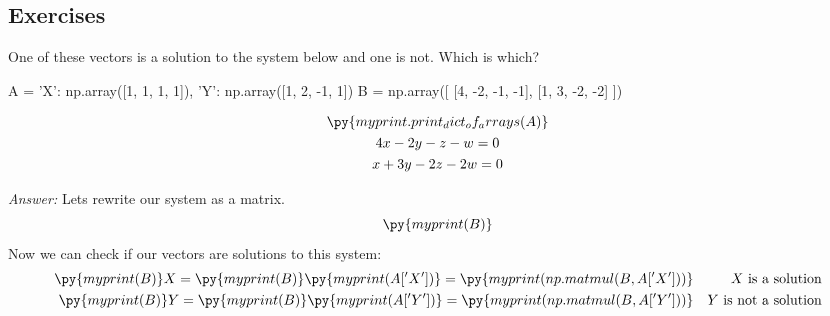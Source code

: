 \documentclass[letter]{article}
\newcommand{\ans}{\textit{Answer: }}
\newenvironment{question}[2][Question]{\begin{trivlist}
\item[\hskip \labelsep {\bfseries #1}\hskip \labelsep {\bfseries #2.}]}{\end{trivlist}}
\begin{document}
\subsection{Exercises}

\begin{question}{1.49}
  One of these vectors is a solution to the system below and one is not. Which is which?
  \begin{pycode}
A = {
  'X': np.array([1, 1, 1, 1]),
  'Y': np.array([1, 2, -1, 1])
}
B = np.array([
  [4, -2, -1, -1],
  [1, 3, -2, -2]
])
  \end{pycode}

  \begin{gather*}
    \py{myprint.print_dict_of_arrays(A)} \\
    4x - 2y - z - w = 0 \\
    x + 3y - 2z - 2w = 0
  \end{gather*}

  \ans Lets rewrite our system as a matrix. 
  $$\py{myprint(B)}$$
  Now we can check if our vectors are solutions to this system:
  \begin{align*}
    \py{myprint(B)}X = \py{myprint(B)}\py{myprint(A['X'])}
     = \py{myprint(np.matmul(B, A['X']))} && X \text{ is a solution} \\
    \py{myprint(B)}Y = \py{myprint(B)}\py{myprint(A['Y'])}
     = \py{myprint(np.matmul(B, A['Y']))} && Y \text{ is not a solution} 
  \end{align*}
\end{question}
\end{document}
